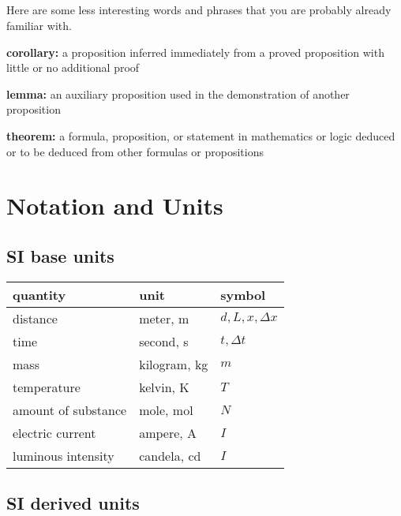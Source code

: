 \paragraph{}
Here are some less interesting words and phrases that you are 
probably already familiar with.

\begin{description}
\item{\textbf{corollary:}}
  a proposition inferred immediately from a proved proposition with little 
  or no additional proof
\item{\textbf{lemma:}}
  an auxiliary proposition used in the demonstration of another proposition
\item{\textbf{theorem:}}
  a formula, proposition, or statement in mathematics or logic deduced or 
  to be deduced from other formulas or propositions
\end{description}


\chapter{Notation and Units}
\label{notationtable}

\section{SI base units}

\noindent\begin{tabular}{|l|l|l|}
\hline
quantity	& unit	& symbol \\
\hline
distance	& meter, m	& $d, L, x, \Delta{}x$ \\
time	& second, s	& $t, \Delta{}t$ \\
mass	& kilogram, kg	& $m$ \\
temperature	& kelvin, K	& $T$ \\
amount of substance & mole, mol & $N$ \\
electric current & ampere, A & $I$ \\
luminous intensity & candela, cd & $I$ \\
\hline
\end{tabular}

\section{SI derived units}

